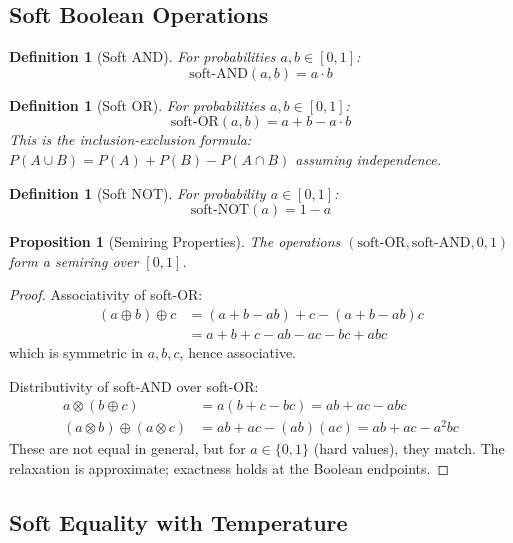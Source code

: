 \documentclass[11pt,a4paper]{article}
\newtheorem{definition}[theorem]{Definition}
\newtheorem{proposition}[theorem]{Proposition}
\begin{document}
\subsection{Soft Boolean Operations}
\label{subsec:soft_bool_chirho}

\begin{definition}[Soft AND]
\label{def:soft_and_chirho}
For probabilities $a, b \in [0, 1]$:
\[
\text{soft-AND}(a, b) = a \cdot b
\]
\end{definition}

\begin{definition}[Soft OR]
\label{def:soft_or_chirho}
For probabilities $a, b \in [0, 1]$:
\[
\text{soft-OR}(a, b) = a + b - a \cdot b
\]
This is the inclusion-exclusion formula: $P(A \cup B) = P(A) + P(B) - P(A \cap B)$ assuming independence.
\end{definition}

\begin{definition}[Soft NOT]
\label{def:soft_not_chirho}
For probability $a \in [0, 1]$:
\[
\text{soft-NOT}(a) = 1 - a
\]
\end{definition}

\begin{proposition}[Semiring Properties]
\label{prop:semiring_properties_chirho}
The operations $(\text{soft-OR}, \text{soft-AND}, 0, 1)$ form a semiring over $[0, 1]$.
\end{proposition}

\begin{proof}
Associativity of soft-OR:
\begin{align*}
(a \oplus b) \oplus c &= (a + b - ab) + c - (a + b - ab)c \\
&= a + b + c - ab - ac - bc + abc
\end{align*}
which is symmetric in $a, b, c$, hence associative.

Distributivity of soft-AND over soft-OR:
\begin{align*}
a \otimes (b \oplus c) &= a(b + c - bc) = ab + ac - abc \\
(a \otimes b) \oplus (a \otimes c) &= ab + ac - (ab)(ac) = ab + ac - a^2bc
\end{align*}
These are not equal in general, but for $a \in \{0, 1\}$ (hard values), they match.
The relaxation is approximate; exactness holds at the Boolean endpoints.
\end{proof}

\subsection{Soft Equality with Temperature}
\label{subsec:soft_eq_chirho}
\end{document}
